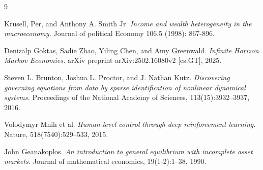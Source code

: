 \documentclass[11pt, a4paper]{article}
\begin{document}

\begin{thebibliography}{9}

Krusell, Per, and Anthony A. Smith Jr.
\textit{Income and wealth heterogeneity in the macroeconomy.}
Journal of political Economy 106.5 (1998): 867-896.

Denizalp Goktas, Sadie Zhao, Yiling Chen, and Amy Greenwald.
\textit{Infinite Horizon Markov Economies.}
arXiv preprint arXiv:2502.16080v2 [cs.GT], 2025.

Steven L. Brunton, Joshua L. Proctor, and J. Nathan Kutz.
\textit{Discovering governing equations from data by sparse identification of nonlinear dynamical systems.}
Proceedings of the National Academy of Sciences, 113(15):3932--3937, 2016.

Volodymyr Mnih et al.
\textit{Human-level control through deep reinforcement learning.}
Nature, 518(7540):529--533, 2015.

John Geanakoplos.
\textit{An introduction to general equilibrium with incomplete asset markets.}
Journal of mathematical economics, 19(1-2):1--38, 1990.

\end{thebibliography}
\end{document}
